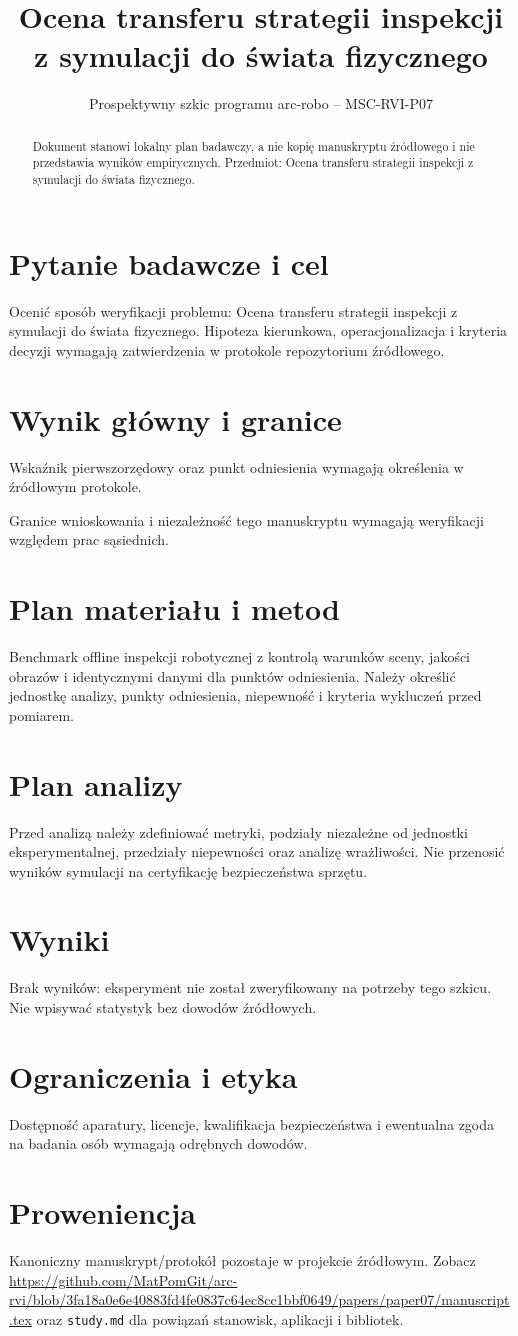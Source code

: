 \documentclass[11pt,a4paper]{article}
\title{Ocena transferu strategii inspekcji z symulacji do świata fizycznego}
\author{}
\date{Prospektywny szkic programu arc-robo -- MSC-RVI-P07}
\begin{document}
\maketitle
\begin{abstract}
Dokument stanowi lokalny plan badawczy, a nie kopię manuskryptu źródłowego i nie przedstawia wyników empirycznych. Przedmiot: Ocena transferu strategii inspekcji z symulacji do świata fizycznego.
\end{abstract}
\section{Pytanie badawcze i cel}
Ocenić sposób weryfikacji problemu: Ocena transferu strategii inspekcji z symulacji do świata fizycznego. Hipoteza kierunkowa, operacjonalizacja i kryteria decyzji wymagają zatwierdzenia w protokole repozytorium źródłowego.
\section{Wynik główny i granice}
Wskaźnik pierwszorzędowy oraz punkt odniesienia wymagają określenia w źródłowym protokole.

Granice wnioskowania i niezależność tego manuskryptu wymagają weryfikacji względem prac sąsiednich.
\section{Plan materiału i metod}
Benchmark offline inspekcji robotycznej z kontrolą warunków sceny, jakości obrazów i identycznymi danymi dla punktów odniesienia. Należy określić jednostkę analizy, punkty odniesienia, niepewność i kryteria wykluczeń przed pomiarem.
\section{Plan analizy}
Przed analizą należy zdefiniować metryki, podziały niezależne od jednostki eksperymentalnej, przedziały niepewności oraz analizę wrażliwości. Nie przenosić wyników symulacji na certyfikację bezpieczeństwa sprzętu.
\section{Wyniki}
Brak wyników: eksperyment nie został zweryfikowany na potrzeby tego szkicu. Nie wpisywać statystyk bez dowodów źródłowych.
\section{Ograniczenia i etyka}
Dostępność aparatury, licencje, kwalifikacja bezpieczeństwa i ewentualna zgoda na badania osób wymagają odrębnych dowodów.
\section{Proweniencja}
Kanoniczny manuskrypt/protokół pozostaje w projekcie źródłowym. Zobacz \url{https://github.com/MatPomGit/arc-rvi/blob/3fa18a0e6e40883fd4fe0837c64ec8cc1bbf0649/papers/paper07/manuscript.tex} oraz \texttt{study.md} dla powiązań stanowisk, aplikacji i bibliotek.
\end{document}
